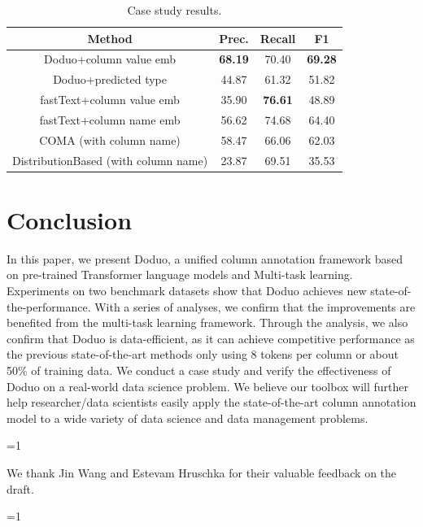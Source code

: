 \documentclass[sigconf]{acmart}
\newcommand{\arxiv}{1} %
\newcommand{\name}{\mbox{\sc Doduo}}
\newcommand{\hll}[1]{#1}
\newcommand{\rev}[1]{#1}
\begin{document}
\begin{table}[t]
\centering
\footnotesize
\caption{Case study results.}\label{tab:case_study} 
\vspace{-1em}
\begin{tabular}{c|ccc}\hline
Method & Prec. & Recall & F1 \\\hline\hline
\name+column value emb & {\bf 68.19} & 70.40 & {\bf 69.28} \\\hline
\name+predicted type & 44.87 & 61.32 & 51.82 \\
fastText+column value emb & 35.90 & {\bf 76.61} & 48.89 \\
fastText+column name emb & 56.62 & 74.68 & 64.40 \\\hline 
\rev{COMA (with column name)} & \rev{58.47} & \rev{66.06} & \rev{62.03} \\
\rev{DistributionBased (with column name)} & \rev{23.87} & \rev{69.51} & \rev{35.53} \\\hline
\end{tabular}
\vspace{-1em}
\end{table}


\section{Conclusion} \label{sec:conclude}
In this paper, we present \name{}, a unified column annotation framework based on pre-trained Transformer language models and Multi-task learning.
%
Experiments on two benchmark datasets show that \name{} achieves new state-of-the-performance. With a series of analyses, we confirm that the improvements are benefited from the multi-task learning framework.
%
Through the analysis, we also confirm that \name{} is data-efficient, as it can achieve competitive performance as the previous state-of-the-art methods only using 8 tokens per column or about 50\% of training data.
%
\hll{We conduct a case study and verify the effectiveness of \name{} on a real-world data science problem. We believe our toolbox will further help researcher/data scientists easily apply the state-of-the-art column annotation model to a wide variety of data science and data management problems.}

\ifnum \arxiv=1

\begin{acks}
We thank Jin Wang and Estevam Hruschka for their valuable feedback  on the draft. 
\end{acks}
\fi


\balance




\ifnum \arxiv=1

\appendix


\fi
\end{document}
